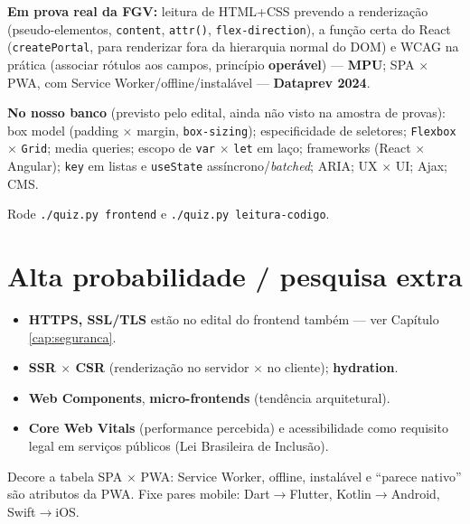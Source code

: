 \begin{jacaiu}
\textbf{Em prova real da FGV:} leitura de HTML+CSS prevendo a renderização
(pseudo-elementos, \texttt{content}, \texttt{attr()},
\texttt{flex-direction}), a função certa do React
(\texttt{createPortal}, para renderizar fora da hierarquia normal do DOM) e
WCAG na prática (associar rótulos aos campos, princípio \textbf{operável})
--- \textbf{MPU}; SPA $\times$ PWA, com Service Worker/offline/instalável ---
\textbf{Dataprev 2024}.

\textbf{No nosso banco} (previsto pelo edital, ainda não visto na amostra de
provas): box model (padding $\times$ margin, \texttt{box-sizing});
especificidade de seletores; \texttt{Flexbox} $\times$ \texttt{Grid}; media
queries; escopo de \texttt{var} $\times$ \texttt{let} em laço; frameworks
(React $\times$ Angular); \texttt{key} em listas e \texttt{useState}
assíncrono/\textit{batched}; ARIA; UX $\times$ UI; Ajax; CMS.

Rode \texttt{./quiz.py frontend} e \texttt{./quiz.py leitura-codigo}.
\end{jacaiu}

\section{Alta probabilidade / pesquisa extra}

\begin{itemize}
\item \textbf{HTTPS, SSL/TLS} estão no edital do frontend também --- ver
Capítulo \ref{cap:seguranca}.
\item \textbf{SSR $\times$ CSR} (renderização no servidor $\times$ no
cliente); \textbf{hydration}.
\item \textbf{Web Components}, \textbf{micro-frontends} (tendência
arquitetural).
\item \textbf{Core Web Vitals} (performance percebida) e acessibilidade
como requisito legal em serviços públicos (Lei Brasileira de Inclusão).
\end{itemize}

\begin{comosair}
Decore a tabela SPA $\times$ PWA: Service Worker, offline, instalável e
``parece nativo'' são atributos da PWA. Fixe pares mobile: Dart$\to$Flutter,
Kotlin$\to$Android, Swift$\to$iOS.
\end{comosair}
